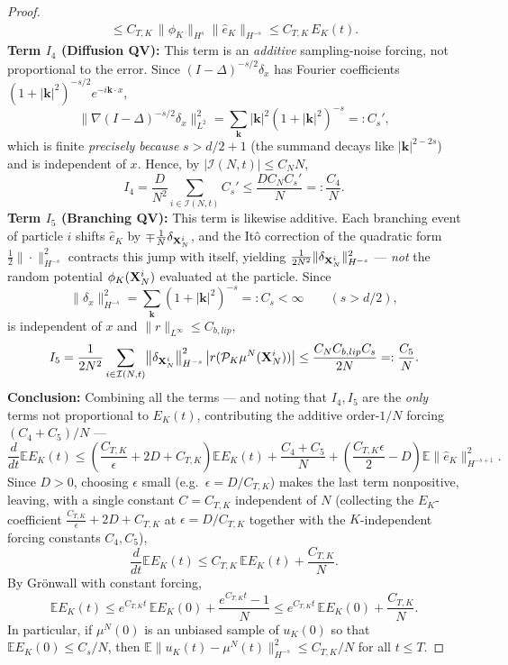 \documentclass[a4paper,fleqn]{cas-sc}
\theoremstyle{definition}
\theoremstyle{remark}
\begin{document}
\begin{proof}
\[\begin{aligned}
\leq  C_{T,K}\,\|\phi_K\|_{H^s}\|\hat e_K\|_{H^{-s}}
\le  C_{T,K}\, E_K(t).
\end{aligned}
\]
\textbf{Term $I_4$ (Diffusion QV):}
This term is an \emph{additive} sampling-noise forcing, not proportional to the
error. Since $(I-\Delta)^{-s/2}\delta_x$ has Fourier coefficients
$(1+|\mathbf k|^2)^{-s/2}e^{-i\mathbf k\cdot x}$,
\[
\bigl\|\nabla(I-\Delta)^{-s/2}\delta_x\bigr\|_{L^2}^2
=\sum_{\mathbf k}|\mathbf k|^2(1+|\mathbf k|^2)^{-s}=:C_s',
\]
which is finite \emph{precisely because} $s>d/2+1$ (the summand decays like
$|\mathbf k|^{2-2s}$) and is independent of $x$. Hence, by $|\mathcal I(N,t)|\le C_NN$,
\begin{equation}
    I_4 = \frac{D}{N^2}\sum_{i\in \mathcal I (N,t)}C_s'
    \le \frac{D C_N C_s'}{N}=:\frac{C_4}{N}.
\end{equation}
\textbf{Term $I_5$ (Branching QV):}
This term is likewise additive. Each branching event of particle $i$ shifts
$\hat e_K$ by $\mp\frac1N\delta_{\mathbf{X}_N^i}$, and the It\^o correction of the
quadratic form $\frac12\|\cdot\|_{H^{-s}}^2$ contracts this jump with itself,
yielding $\frac{1}{2N^2}\|\delta_{\mathbf{X}_N^i}\|_{H^{-s}}^2$ --- \emph{not} the random
potential $\phi_K(\mathbf{X}_N^i)$ evaluated at the particle. Since
\[
\|\delta_x\|_{H^{-s}}^2=\sum_{\mathbf k}(1+|\mathbf k|^2)^{-s}=:C_s<\infty
\qquad(s>d/2),
\]
is independent of $x$ and $\|r\|_{L^\infty}\le C_{b,lip}$,
\[
    I_5 = \frac{1}{2N^2}\sum_{i\in \mathcal I (N,t)}
    \bigl\|\delta_{\mathbf{X}_N^i}\bigr\|_{H^{-s}}^2\,\bigl|r(\mathcal P_K\mu^N(\mathbf{X}_N^i))\bigr|
    \le \frac{C_N C_{b,lip} C_s}{2N}=:\frac{C_5}{N}.
\]
\textbf{Conclusion:}
Combining all the terms --- and noting that $I_4,I_5$ are the \emph{only} terms not
proportional to $E_K(t)$, contributing the additive order-$1/N$ forcing
$(C_4+C_5)/N$ ---
\[
\frac{d}{dt}\mathbb{E}E_{K}(t) \le \left( \frac{C_{T,K}}{\epsilon} + 2D + C_{T,K} \right) \mathbb{E}E_K(t) + \frac{C_4+C_5}{N} + \left( \frac{C_{T,K} \epsilon}{2} - D \right) \mathbb{E}\|\hat{e}_{K}\|_{H^{-s+1}}^{2}.
\]
Since $D > 0$, choosing $\epsilon$ small (e.g.\ $\epsilon = D/C_{T,K}$) makes the last
term nonpositive, leaving, with a single constant $C=C_{T,K}$ independent of $N$
(collecting the $E_K$-coefficient $\tfrac{C_{T,K}}{\epsilon}+2D+C_{T,K}$ at
$\epsilon=D/C_{T,K}$ together with the $K$-independent forcing constants $C_4,C_5$),
\[
    \frac{d}{dt} \mathbb E  E_K(t) \leq C_{T,K}\, \mathbb E  E_K(t) + \frac{C_{T,K}}{N}. 
\]
By Gr\"onwall with constant forcing,
\[
\mathbb E E_K(t) \leq e^{C_{T,K}t}\,\mathbb E E_K(0) + \frac{e^{C_{T,K}t}-1}{N}
\le e^{C_{T,K}t}\,\mathbb E E_K(0) + \frac{C_{T,K}}{N}.
\]
In particular, if $\mu^N(0)$ is an unbiased sample of $u_K(0)$ so that
$\mathbb E E_K(0)\le C_s/N$, then
$\mathbb E\|u_K(t)-\mu^N(t)\|_{H^{-s}}^2\le C_{T,K}/N$ for all $t\le T$.
\end{proof}
\end{document}
